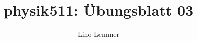

\renewcommand\thesection{Übung \arabic{section}}
\renewcommand\thesubsection{\arabic{section}\alph{subsection}}

\title{physik511: Übungsblatt 03}
\author{Lino Lemmer}


\maketitle


